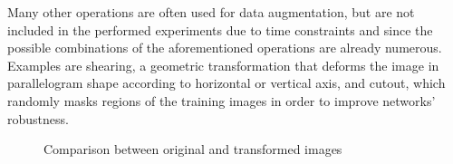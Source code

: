 \documentclass[%
    corpo=12pt,
    twoside,
    stile=classica,   
    tipotesi=magistrale,
    evenboxes,
    english,
	numerazioneromana,
]{toptesi}
\begin{document}
Many other operations are often used for data augmentation, but are not included in the performed experiments due to time constraints and since the possible combinations of the aforementioned operations are already numerous. Examples are shearing, a geometric transformation that deforms the image in parallelogram shape according to horizontal or vertical axis,
and cutout, which randomly masks regions of the training images in order to improve networks' robustness.

\begin{figure}[ht]
	\centering
	\caption{Comparison between original and transformed images}
	\label{fig:augs}
\end{figure}
\end{document}
